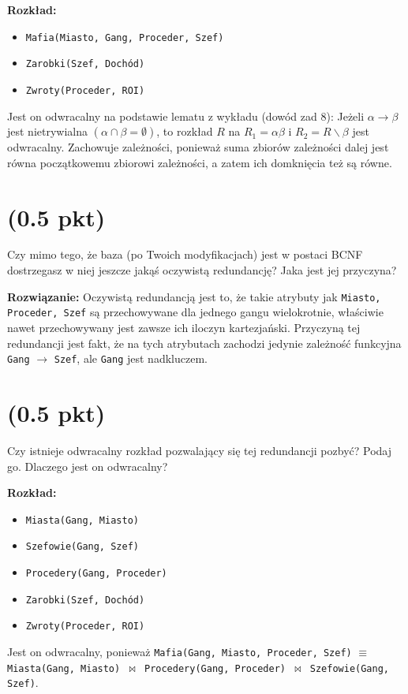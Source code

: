 \documentclass{article}
\begin{document}
\textbf{Rozkład:}\begin{itemize}
        \item \texttt{Mafia(Miasto, Gang, Proceder, Szef)}
        \item \texttt{Zarobki(Szef, Dochód)}
        \item \texttt{Zwroty(Proceder, ROI)}
\end{itemize}
Jest on odwracalny na podstawie lematu z wykładu (dowód zad 8):
        Jeżeli $\alpha \rightarrow \beta$ jest nietrywialna $(\alpha \cap \beta = \emptyset)$, to rozkład $R$ na $R_1 = \alpha \beta$ i $R_2 = R \backslash \beta$ jest odwracalny.
Zachowuje zależności, ponieważ suma zbiorów zależności dalej jest równa początkowemu zbiorowi zależności, a zatem ich domknięcia też są równe.

\section{(0.5 pkt)} Czy mimo tego, że baza (po Twoich modyfikacjach) jest w postaci BCNF dostrzegasz w niej jeszcze jakąś oczywistą redundancję? Jaka jest jej przyczyna?

\textbf{Rozwiązanie:} Oczywistą redundancją jest to, że takie atrybuty jak \texttt{Miasto, Proceder, Szef} są przechowywane dla jednego gangu wielokrotnie, właściwie nawet przechowywany jest zawsze ich iloczyn kartezjański. Przyczyną tej redundancji jest fakt, że na tych atrybutach zachodzi jedynie zależność funkcyjna \texttt{Gang} $\rightarrow$ \texttt{Szef}, ale \texttt{Gang} jest nadkluczem.

\section{(0.5 pkt)} Czy istnieje odwracalny rozkład pozwalający się tej redundancji pozbyć? Podaj go. Dlaczego jest on odwracalny?

\textbf{Rozkład:} \begin{itemize}
        \item \texttt{Miasta(Gang, Miasto)}
        \item \texttt{Szefowie(Gang, Szef)}
        \item \texttt{Procedery(Gang, Proceder)}
        \item \texttt{Zarobki(Szef, Dochód)}
        \item \texttt{Zwroty(Proceder, ROI)}
\end{itemize} Jest on odwracalny, ponieważ \texttt{Mafia(Gang, Miasto, Proceder, Szef)} $\equiv$ \newline \texttt{Miasta(Gang, Miasto) $\Join$ \newline Procedery(Gang, Proceder) $\Join$ \newline Szefowie(Gang, Szef)}.
\end{document}
